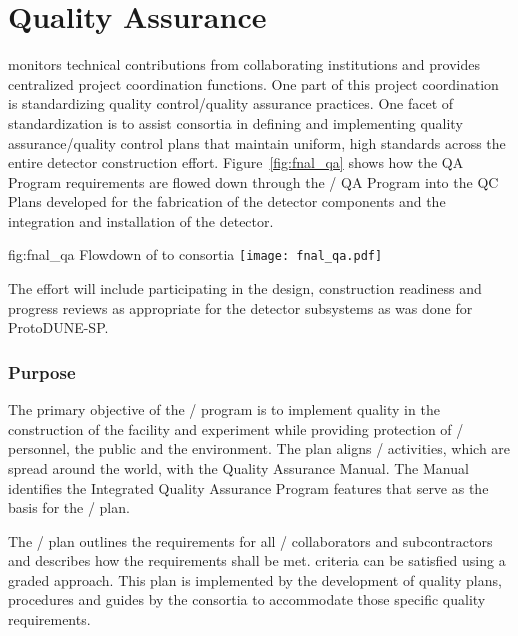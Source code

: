 \chapter{Quality Assurance}
\label{vl:tc-QA}

  monitors technical contributions from
collaborating institutions and provides centralized project
coordination functions. One part of this project coordination is
standardizing quality control/quality assurance practices. One facet
of standardization is to assist consortia in defining and implementing
quality assurance/quality control plans that maintain uniform, high
standards across the entire detector construction effort. Figure~\ref{fig:fnal_qa}
shows how the \fnal QA Program requirements are flowed down through
the / QA Program into the QC Plans developed for the
fabrication of the detector components and the integration and
installation of the detector.
\begin{dunefigure}{fig:fnal_qa}
  {Flowdown of \fnal {} to consortia}
  \texttt{[image: fnal\_qa.pdf]}
\end{dunefigure}
The  effort will include participating in the design,
construction readiness and progress reviews as appropriate for the
 detector subsystems as was done for ProtoDUNE-SP.

\subsection{Purpose}

The primary objective of the / 
program is to implement quality in the construction of the
 facility and  experiment while providing
protection of / personnel, the public and the
environment. The  plan aligns /
 activities, which are spread around the world, with the
\fnal Quality Assurance Manual. The Manual identifies the \fnal
Integrated Quality Assurance Program features that serve as the basis
for the /  plan.

The /  plan outlines the 
requirements for all / collaborators and
subcontractors and describes how the requirements shall be met.
 criteria can be satisfied using a graded approach. This
 plan is implemented by the development of quality plans,
procedures and guides by the consortia to accommodate those specific
quality requirements.

